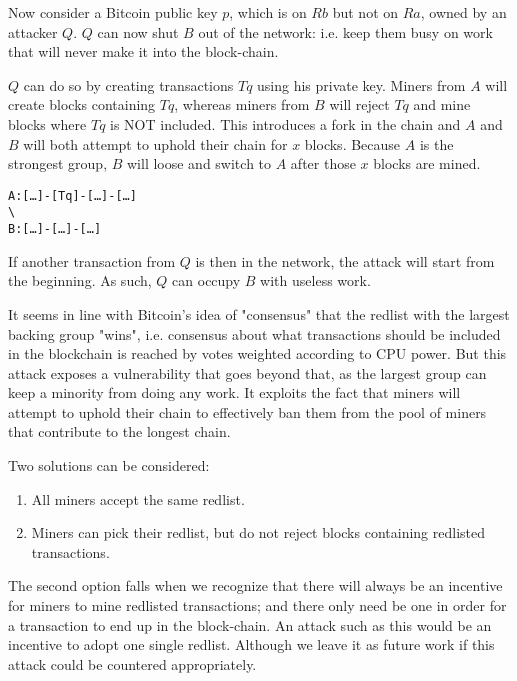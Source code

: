 \documentclass[12pt,journal,compsoc]{IEEEtran}
\begin{document}
Now consider a Bitcoin public key $p$, which is on $Rb$ but not on $Ra$, owned by an attacker $Q$.
$Q$ can now shut $B$ out of the network: i.e. keep them busy on work that will never make it
into the block-chain.

$Q$ can do so by creating transactions $Tq$ using his private key.
Miners from $A$ will create blocks containing $Tq$, whereas miners from $B$ will reject $Tq$ and mine blocks where $Tq$ is NOT included.
This introduces a fork in the chain and $A$ and $B$ will both attempt to uphold their chain for $x$ blocks.
Because $A$ is the strongest group, $B$ will loose and switch to $A$ after those $x$ blocks are mined.
\newline
 \begin{alltt}
A:   [\ldots]\--[Tq]\--[\ldots]\--[\ldots]
      	   \textbackslash
B:         [\ldots]\--[\ldots]\--[\ldots]

\end{alltt}

If another transaction from $Q$ is then in the network, the attack will start from the beginning.
As such, $Q$ can occupy $B$ with useless work.

It seems in line with Bitcoin's idea of "consensus" that the redlist with the largest backing group
"wins", i.e. consensus about what transactions should be included in the blockchain is reached by
votes weighted according to CPU power.
But this attack exposes a vulnerability that goes beyond that, as the largest group can keep a
minority from doing any work.
It exploits the fact that miners will attempt to uphold their chain to
effectively ban them from the pool of miners that contribute to the longest chain.

Two solutions can be considered:

\begin{enumerate}
\item All miners accept the same redlist.
\item Miners can pick their redlist, but do not reject blocks containing redlisted transactions.
\end{enumerate}

The second option falls when we recognize that there will always be an incentive for miners to mine
redlisted transactions; and there only need be one in order for a transaction to end up in the
block-chain.
An attack such as this would be an incentive to adopt one single redlist.
Although we leave it as future work if this attack could be countered appropriately.
\end{document}
